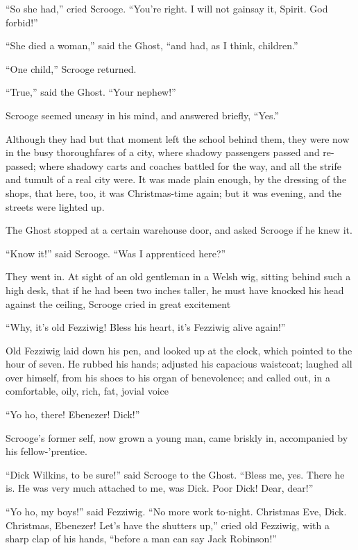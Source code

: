 \documentclass[paper=5.5in:8.5in,BCOR=5mm,twoside,DIV=calc,12pt,usegeometry]{scrbook} %
\begin{document}
\enquote{So she had,} cried Scrooge. \enquote{You're right. I will not gainsay it, Spirit. God forbid!}

\enquote{She died a woman,} said the Ghost, \enquote{and had, as I think, children.}

\enquote{One child,} Scrooge returned.

\afterpage{\clearpage}

\enquote{True,} said the Ghost. \enquote{Your nephew!}

Scrooge seemed uneasy in his mind, and answered briefly, \enquote{Yes.}

Although they had but that moment left the school behind them, they were now in the busy thoroughfares of a city, where shadowy passengers passed and re-passed; where shadowy carts and coaches battled for the way, and all the strife and tumult of a real city were. It was made plain enough, by the dressing of the shops, that here, too, it was Christmas-time again; but it was evening, and the streets were lighted up.

The Ghost stopped at a certain warehouse door, and asked Scrooge if he knew it.

\enquote{Know it!} said Scrooge. \enquote{Was I apprenticed here?}

They went in. At sight of an old gentleman in a Welsh wig, sitting behind such a high desk, that if he had been two inches taller, he must have knocked his head against the ceiling, Scrooge cried in great excitement\textemdash 

\enquote{Why, it's old Fezziwig! Bless his heart, it's Fezziwig alive again!}

Old Fezziwig laid down his pen, and looked up at the clock, which pointed to the hour of seven. He rubbed his hands; adjusted his capacious waistcoat; laughed all over himself, from his shoes to his organ of benevolence; and called out, in a comfortable, oily, rich, fat, jovial voice\textemdash 

\enquote{Yo ho, there! Ebenezer! Dick!}

Scrooge's former self, now grown a young man, came briskly in, accompanied by his fellow-'prentice.

\enquote{Dick Wilkins, to be sure!} said Scrooge to the Ghost. \enquote{Bless me, yes. There he is. He was very much attached to me, was Dick. Poor Dick! Dear, dear!}

\enquote{Yo ho, my boys!} said Fezziwig. \enquote{No more work to-night. Christmas Eve, Dick. Christmas, Ebenezer! Let's have the shutters up,} cried old Fezziwig, with a sharp clap of his hands, \enquote{before a man can say Jack Robinson!}
\end{document}
